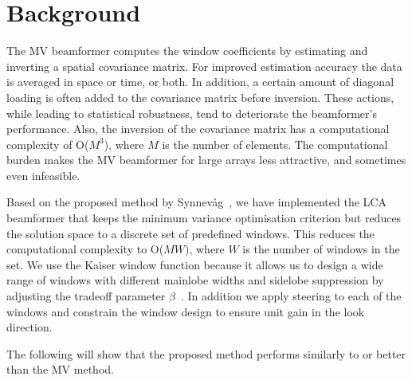 \documentclass[10pt,journal,draftclsnofoot,onecolumn]{IEEEtran}
\newcommand\1{\vec 1}
\begin{document}
\section{Background}



The MV beamformer computes the window coefficients by estimating and inverting a spatial covariance matrix. For improved estimation accuracy the data is averaged in space or time, or both. In addition, a certain amount of diagonal loading is often added to the covariance matrix before inversion. These actions, while leading to statistical robustness, tend to deteriorate the beamformer's performance. Also, the inversion of the covariance matrix has a computational complexity of O($M^3$), where $M$ is the number of elements. The computational burden makes the MV beamformer for large arrays less attractive, and sometimes even infeasible.

Based on the proposed method by Synnevåg~\cite{syn11}, we have implemented the LCA beamformer that keeps the minimum variance optimisation criterion but reduces the solution space to a discrete set of predefined windows. This reduces the computational complexity to O($MW$), where $W$ is the number of windows in the set. We use the Kaiser window function because it allows us to design a wide range of windows with different mainlobe widths and sidelobe suppression by adjusting the tradeoff parameter $\beta$~\cite{kai66}. In addition we apply steering to each of the windows and constrain the window design to ensure unit gain in the look direction.

The following will show that the proposed method performs similarly to or better than the MV method.
\end{document}
